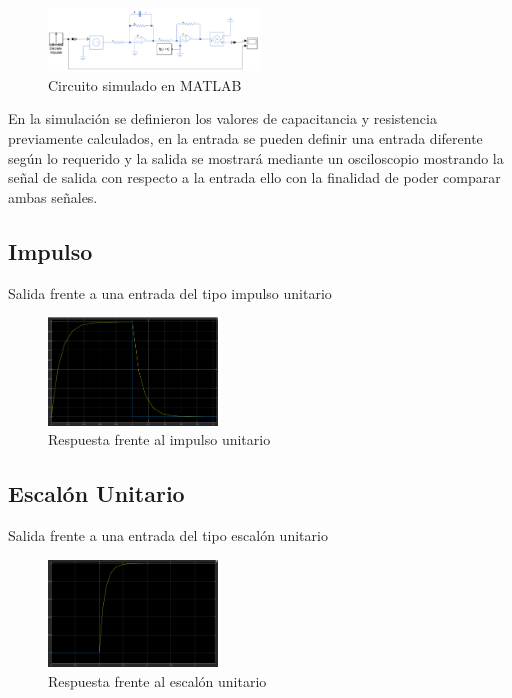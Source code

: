 \documentclass[conference]{IEEEtran}
\begin{document}
	\begin{figure}[h]
		\centering
		\includegraphics[width=0.5\textwidth]{media/circuito-matlab}
		\caption{Circuito simulado en MATLAB}
		\label{fig:circuito-matlab}
	\end{figure}
	
	En la simulación se definieron los valores de capacitancia y resistencia previamente calculados, en la entrada se pueden definir una entrada diferente según lo requerido y la salida se mostrará mediante un osciloscopio mostrando la señal de salida con respecto a la entrada ello con la finalidad de poder comparar ambas señales.
	
	\subsection{Impulso}
	Salida frente a una entrada del tipo impulso unitario
	\begin{figure}[h]
		\centering
		\includegraphics[width=0.4\textwidth]{media/impulso}
		\caption{Respuesta frente al impulso unitario}
		\label{fig:impulso}
	\end{figure}
		

	\subsection{Escalón Unitario}
	Salida frente a una entrada del tipo escalón unitario
	\begin{figure}[h]
		\centering
		\includegraphics[width=0.4\textwidth]{media/escalon_unitario}
		\caption{Respuesta frente al escalón unitario}
		\label{fig:escalonunitario}
	\end{figure}
	
\end{document}
